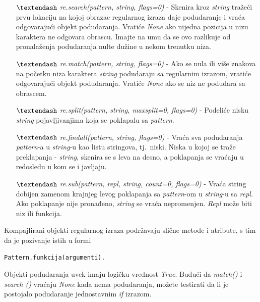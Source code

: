 \documentclass[12pt,oneside]{memoir}
\theoremstyle{plain}
\theoremstyle{definition}
\begin{document}
\begin{itemize}
\item[$\textendash$]  \textit{re.search(pattern, string, flags=0)} - Skenira kroz \textit{string} tražeći prvu lokaciju na kojoj obrazac regularnog izraza daje podudaranje i vraća odgovarajući objekt podudaranja. Vratiće \textit{None} ako nijedna pozicija u nizu karaktera ne odgovara obrascu. Imajte na umu da se ovo razlikuje od pronalaženja podudaranja nulte dužine u nekom trenutku niza.
\item[$\textendash$]  \textit{re.match(pattern, string, flags=0)} - Ako se nula ili više znakova na početku niza karaktera \textit{string}  podudaraju sa regularnim izrazom, vratiće odgovarajući objekt podudaranja. Vratiće \textit{None} ako se niz ne podudara sa obrascem.
\item[$\textendash$]  \textit{re.split(pattern, string, maxsplit=0, flags=0)} - Podeliće nisku \textit{string} pojavljivanjima koja se poklapalu sa \textit{pattern}. 
\item[$\textendash$]  \textit{re.findall(pattern, string, flags=0)} - Vraća sva podudaranja \textit{pattern}-a u \textit{string}-u kao listu stringova, tj.~niski. Niska u kojoj se traže preklapanja - \textit{string}, skenira se s leva na desno, a poklapanja se vraćaju u redosledu u kom se i javljaju. 
\item[$\textendash$]  \textit{re.sub(pattern, repl, string, count=0, flags=0)} - Vraća string dobijen zamenom krajnjeg levog poklapanja sa \textit{pattern}-om u \textit{string}-u sa \textit{repl}. Ako poklapanje nije pronađeno, \textit{string} se vraća nepromenjen. \textit{Repl} može biti niz ili funkcija.
\end{itemize}

Kompajlirani objekti regularnog izraza podržavaju slične metode i atribute, s tim da je pozivanje istih u formi
\begin{center}
\texttt{Pattern.funkcija(argumenti).}
\end{center}

Objekti podudaranja uvek imaju logičku vrednost \textit{True}. Budući da \textit{match()} i \textit{search ()} vraćaju \textit{None} kada nema podudaranja, možete testirati da li je postojalo podudaranje jednostavnim \textit{if} izrazom. 
\end{document}
